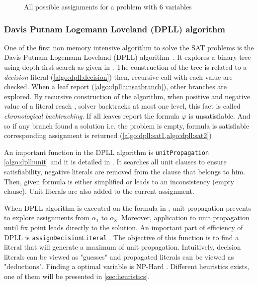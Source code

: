 \begin{figure}[H]
	\centering
	
	\caption{All possible assignments for a problem with 6 variables}
	\label{fig:naive_algo}
\end{figure}


\subsubsection{Davis Putnam Logemann Loveland (DPLL) algorithm}

One of the first non memory intensive algorithm to solve the SAT problems is 
the Davis Putnam Logemann Loveland (DPLL) algorithm~\cite{dpll_62}. 
It explores a binary tree using depth first search as given in .
The construction of the tree is related to a \emph{decision} literal (\cref{algo:dpll:decision}) then,
recursive call with each value are checked.
When a leaf report \unsat (\cref{algo:dpll:unsatbranch}), other branches are explored.
By recursive construction of the algorithm, when positive and negative value of a literal reach \unsat,
solver backtracks at most one level, this fact is called \emph{chronological backtracking}.
If all leaves report \unsat the formula $\varphi$ is unsatisfiable.
And so  if any branch found a solution  i.e. the problem is empty,
formula is satisfiable corresponding assignment is returned (\cref{algo:dpll:sat1,algo:dpll:sat2})



An important function in the DPLL algorithm is \texttt{unitPropagation} \cref{algo:dpll:unit} and
it is detailed in . It searches all unit clauses to ensure satisfiability,
negative literals are removed from the clause that belongs to him. Then, given formula is either simplified
or leads to an inconsistency (empty clause). Unit literals are also added to the current assignment.



When DPLL algorithm is executed on the formula in , unit propagation prevents to 
explore assignments from $\alpha_1 $ to $\alpha_{8}$. Moreover, application to unit propagation until fix point
leads directly to the solution. 
An important part of efficiency of DPLL is \texttt{assignDecisionLiteral} . The objective of this function 
is to find a literal that will generate a maximum of unit propagation. Intuitively, decision literals 
can be viewed as "guesses" and propagated literals can be viewed as "deductions". Finding a optimal variable
is NP-Hard \cite{biere2009handbook}. Different heuristics exists, one of them will be presented in \ref{sec:heuristics}.


